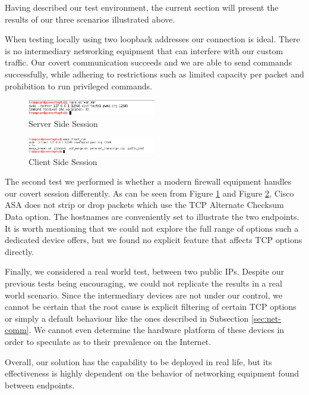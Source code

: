
Having described our test environment, the current section will present the
results of our three scenarios illustrated above.

When testing locally using two loopback addresses our connection is ideal.
There is no intermediary networking equipment that can interfere with our
custom traffic. Our covert communication succeeds and we are able to send
commands successfully, while adhering to restrictions such as limited capacity
per packet and prohibition to run privileged commands.

\begin{figure}
  \centering
  \includegraphics[width=0.5\textwidth]{img/server-run}
  \caption{Server Side Session}
  \label{fig:server-run}
\end{figure}

\begin{figure}
  \centering
  \includegraphics[width=0.5\textwidth]{img/client-run}
  \caption{Client Side Session}
  \label{fig:client-run}
\end{figure}

The second test we performed is whether a modern firewall equipment handles
our covert session differently. As can be seen from Figure
\ref{fig:server-run} and Figure \ref{fig:client-run}, Cisco ASA does not strip
or drop packets which use the TCP Alternate Checksum Data option. The
hostnames are conveniently set to illustrate the two endpoints. It is worth
mentioning that we could not explore the full range of options such a
dedicated device offers, but we found no explicit feature that affects TCP
options directly.

Finally, we considered a real world test, between two public IPs. Despite our
previous tests being encouraging, we could not replicate the results in a real
world scenario. Since the intermediary devices are not under our control, we
cannot be certain that the root cause is explicit filtering of certain TCP
options or simply a default behaviour like the ones described in Subsection
\ref{sec:net-comm}. We cannot even determine the hardware platform of these
devices in order to speculate as to their prevalence on the Internet.

Overall, our solution has the capability to be deployed in real life, but its
effectiveness is highly dependent on the behavior of networking equipment
found between endpoints.
